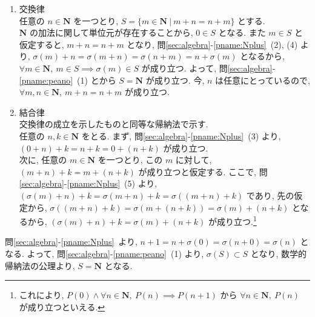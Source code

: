 \begin{nmprob}
{\begin{enumerate}
    \item 交換律\\
    任意の $n \in \bm{N}$ を一つとり, $S = \{ m \in \bm{N}\ |\ m + n = n + m\}$ とする.\\
    $\bm{N}$ の加法に関して単位元が存在することから, $0 \in S$ となる.
    また $m \in S$ と仮定すると, $m + n = n + m$ となり, 問\ref{sec:algebra}-\ref{pname:Nplus}\ (2), (4) より,
    $\sigma (m) + n = \sigma (m + n) = \sigma (n + m) = n + \sigma (m)$ となるから, $\forall m \in \bm{N},\ m \in S \implies \sigma (m) \in S$ が成り立つ.
    よって, 問\ref{sec:algebra}-\ref{pname:peano}\ (1) とから $S = \bm{N}$ が成り立つ. 今, $n$ は任意にとっているので, $\forall m, n\in \bm{N},\ m + n = n + m$ が成り立つ.
    \item 結合律\\
    交換律の成立を示したものと同等な帰納法で示す.\\
    任意の $n, k \in \bm{N}$ をとる. まず, 問\ref{sec:algebra}-\ref{pname:Nplus}\ (3) より, $(0 + n) + k = n + k = 0 + (n + k)$ が成り立つ.\\
    次に, 任意の $m \in \bm{N}$ を一つとり, この $m$ に対して, $(m + n) + k = m + (n + k)$ が成り立つと仮定する.
    ここで, 問\ref{sec:algebra}-\ref{pname:Nplus}\ (5) より, $(\sigma (m) + n) + k = \sigma (m + n) + k = \sigma ((m + n) + k)$ であり, 先の仮定から, $\sigma ((m + n) + k) = \sigma (m + (n + k)) = \sigma (m) + (n + k)$
    となるから, $(\sigma (m) + n) + k = \sigma (m) + (n + k)$ が成り立つ.\footnote[4]{これにより, $P(0) \land \forall n \in \bm{N},\ P(n) \implies P(n + 1)$ から $\forall n \in \bm{N},\ P(n)$ が成り立つといえる.}
\end{enumerate}
\item 問\ref{sec:algebra}-\ref{pname:Nplus}\ より, $n + 1 = n + \sigma (0) = \sigma (n + 0) = \sigma (n)$ となる.
よって, 問\ref{sec:algebra}-\ref{pname:peano}\ (1) より, $\sigma (S) \subset S$ となり, 数学的帰納法の公理より, $S = \bm{N}$ となる.
}
\makeatletter\tagsleft@false\makeatother
\end{nmprob}



